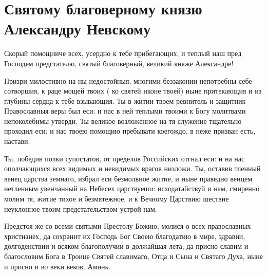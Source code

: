 \label{_content_za-voinov}


\section{Святому благоверному князю Александру Невскому}\begin{mymulticols}


Скорый помощниче всех, усердно к тебе прибегающих, и теплый наш пред Господем предстателю, святый благоверный, великий княже Александре! 

Призри милостивно на ны недостойныя, многими беззаконии непотребны себе сотворшия, к раце мощей твоих ( ко святей иконе твоей) ныне притекающия и из глубины сердца к тебе взывающия. Ты в житии твоем ревнитель и защитник Православныя веры был еси: и нас в ней теплыми твоими к Богу молитвами непоколебимы утверди. Ты великое возложенное на тя служение тщательно проходил еси: и нас твоею помощию пребывати коегождо, в неже призван есть, настави. 

Ты, победив полки супостатов, от пределов Российских отгнал еси: и на нас ополчающихся всех видимых и невидимых врагов низложи. Ты, оставив тленный венец царства земнаго, избрал еси безмолвное житие, и ныне праведно венцем нетленным увенчанный на Небесех царствуеши: исходатайствуй и нам, смиренно молим тя, житие тихое и безмятежное, и к Вечному Царствию шествие неуклонное твоим предстательством устрой нам. 

Предстоя же со всеми святыми Престолу Божию, молися о всех православных христианех, да сохранит их Господь Бог Своею благодатию в мире, здравии, долгоденствии и всяком благополучии в должайшая лета, да присно славим и благословим Бога в Троице Святей славимаго, Отца и Сына и Святаго Духа, ныне и присно и во веки веков. Аминь.

\end{mymulticols}

